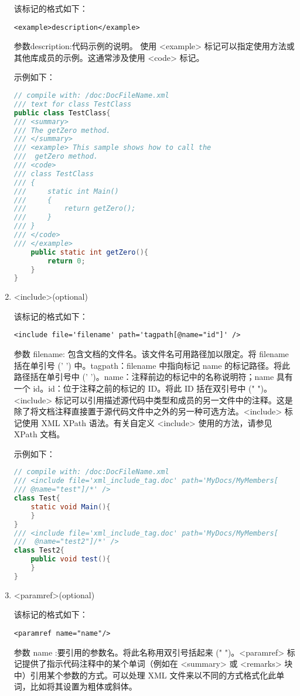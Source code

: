 \begin{enumerate}
该标记的格式如下：
\begin{lstlisting}
<example>description</example>
\end{lstlisting}
参数description:代码示例的说明。 使用 <example> 标记可以指定使用方法或其他库成员的示例。这通常涉及使用 <code> 标记。

示例如下：
\begin{lstlisting}[language=java]
// compile with: /doc:DocFileName.xml 
/// text for class TestClass
public class TestClass{
/// <summary>
/// The getZero method.
/// </summary>
/// <example> This sample shows how to call the 
///  getZero method.
/// <code>
/// class TestClass 
/// {
///     static int Main() 
///     {
///         return getZero();
///     }
/// }
/// </code>
/// </example>
    public static int getZero(){
        return 0;
    }
}
\end{lstlisting}

\item <include>(optional)

该标记的格式如下：
\begin{lstlisting}
<include file='filename' path='tagpath[@name="id"]' />
\end{lstlisting}
参数 filename: 包含文档的文件名。该文件名可用路径加以限定。将 filename 括在单引号 (' ') 中。tagpath：filename 中指向标记 name 的标记路径。将此路径括在单引号中 (' ')。name：注释前边的标记中的名称说明符；name 具有一个 id。id：位于注释之前的标记的 ID。将此 ID 括在双引号中 (" ")。
<include> 标记可以引用描述源代码中类型和成员的另一文件中的注释。这是除了将文档注释直接置于源代码文件中之外的另一种可选方法。<include> 标记使用 XML XPath 语法。有关自定义 <include> 使用的方法，请参见 XPath 文档。

示例如下：
\begin{lstlisting}[language=java]
// compile with: /doc:DocFileName.xml 
/// <include file='xml_include_tag.doc' path='MyDocs/MyMembers[
/// @name="test"]/*' />
class Test{
    static void Main(){ 
    }
}
/// <include file='xml_include_tag.doc' path='MyDocs/MyMembers[
///  @name="test2"]/*' />
class Test2{
    public void test(){ 
    }
}
\end{lstlisting}

\item <paramref>(optional)

该标记的格式如下：
\begin{lstlisting}
<paramref name="name"/>
\end{lstlisting}
参数 name :要引用的参数名。将此名称用双引号括起来 (" ")。<paramref> 标记提供了指示代码注释中的某个单词（例如在 <summary> 或 <remarks> 块中）引用某个参数的方式。可以处理 XML 文件来以不同的方式格式化此单词，比如将其设置为粗体或斜体。


\end{enumerate}
